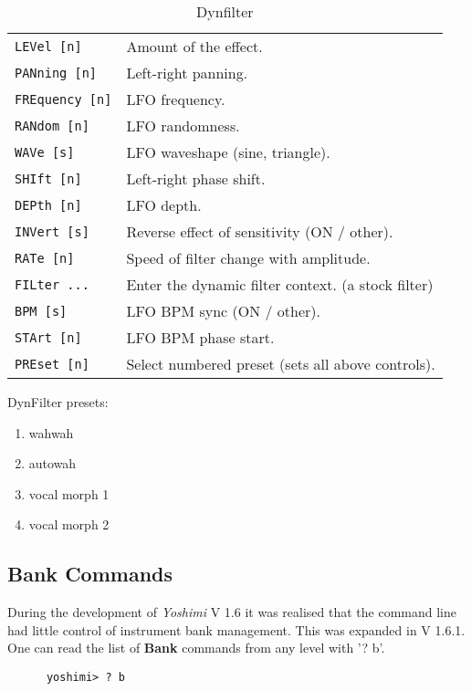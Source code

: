    \begin{table}[H]
      \centering
      \caption{Dynfilter}
      \begin{tabular}{l l}
\texttt{LEVel [n]} &
   Amount of the effect. \\
\texttt{PANning [n]} &
   Left-right panning. \\
\texttt{FREquency [n]} &
   LFO frequency. \\
\texttt{RANdom [n]} &
   LFO randomness. \\
\texttt{WAVe [s]} &
   LFO waveshape (sine, triangle). \\
\texttt{SHIft [n]} &
   Left-right phase shift. \\
\texttt{DEPth [n]} &
   LFO depth. \\
\texttt{INVert [s]} &
   Reverse effect of sensitivity (ON / other). \\
\texttt{RATe [n]} &
   Speed of filter change with amplitude. \\
\texttt{FILter ...} &
   Enter the dynamic filter context. (a stock filter)\\
\texttt{BPM [s]} &
   LFO BPM sync (ON / other). \\
\texttt{STArt [n]} &
   LFO BPM phase start. \\
\texttt{PREset [n]} &
   Select numbered preset (sets all above controls). \\
      \end{tabular}
   \end{table}
DynFilter presets:
   \begin{enumerate}
   \item wahwah
   \item autowah
   \item vocal morph 1
   \item vocal morph 2
   \end{enumerate}

\subsection{Bank Commands}
\label{subsec:command_line_bank_command_list}

   During the development of \textsl{Yoshimi} V 1.6 it was realised that
   the command line had little control of instrument bank management.
   This was expanded in V 1.6.1. One can read the list of
   \textbf{Bank} commands from any level with '? b'.

   \begin{verbatim}
      yoshimi> ? b
   \end{verbatim}

